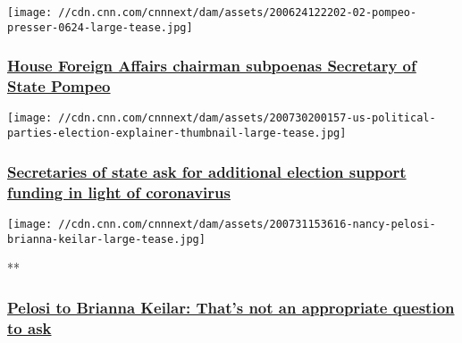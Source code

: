 \href{/2020/07/31/politics/engel-pompeo-subpoena/index.html}{}

\texttt{[image: //cdn.cnn.com/cnnnext/dam/assets/200624122202-02-pompeo-presser-0624-large-tease.jpg]}

\hypertarget{house-foreign-affairs-chairman-subpoenas-secretary-of-state-pompeo-}{%
\subsubsection{\texorpdfstring{\href{/2020/07/31/politics/engel-pompeo-subpoena/index.html}{House
Foreign Affairs chairman subpoenas Secretary of State Pompeo
}}{House Foreign Affairs chairman subpoenas Secretary of State Pompeo }}\label{house-foreign-affairs-chairman-subpoenas-secretary-of-state-pompeo-}}

\href{/2020/07/31/politics/secretaries-of-state-election-support-funding-coronavirus/index.html}{}

\texttt{[image: //cdn.cnn.com/cnnnext/dam/assets/200730200157-us-political-parties-election-explainer-thumbnail-large-tease.jpg]}

\hypertarget{secretaries-of-state-ask-for-additional-election-support-funding-in-light-of-coronavirus}{%
\subsubsection{\texorpdfstring{\href{/2020/07/31/politics/secretaries-of-state-election-support-funding-coronavirus/index.html}{Secretaries
of state ask for additional election support funding in light of
coronavirus}}{Secretaries of state ask for additional election support funding in light of coronavirus}}\label{secretaries-of-state-ask-for-additional-election-support-funding-in-light-of-coronavirus}}

\href{/videos/politics/2020/07/31/nancy-pelosi-brianna-keilar-question-inappropriate-intv-nr-vpx.cnn}{}

\texttt{[image: //cdn.cnn.com/cnnnext/dam/assets/200731153616-nancy-pelosi-brianna-keilar-large-tease.jpg]}

**

\hypertarget{pelosi-to-brianna-keilar-thats-not-an-appropriate-question-to-ask}{%
\subsubsection{\texorpdfstring{\href{/videos/politics/2020/07/31/nancy-pelosi-brianna-keilar-question-inappropriate-intv-nr-vpx.cnn}{Pelosi
to Brianna Keilar: That's not an appropriate question to
ask}}{Pelosi to Brianna Keilar: That's not an appropriate question to ask}}\label{pelosi-to-brianna-keilar-thats-not-an-appropriate-question-to-ask}}


